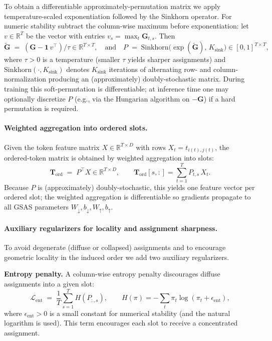 To obtain a differentiable approximately-permutation matrix we apply temperature-scaled exponentiation followed by the Sinkhorn operator. For numeric stability subtract the column-wise maximum before exponentiation: let \(v\in\mathbb{R}^T\) be the vector with entries \(v_s=\max_{t}\mathbf{G}_{t,s}\). Then
\begin{equation}
\tilde{\mathbf{G}} \;=\; (\mathbf{G} - \mathbf{1}\,v^\top)/\tau \in\mathbb{R}^{T\times T},
\quad\text{and}\quad
P \;=\; \mathrm{Sinkhorn}\big(\exp(\tilde{\mathbf{G}}),\,K_{\mathrm{sink}}\big)\in[0,1]^{T\times T},
\end{equation}
where \(\tau>0\) is a temperature (smaller \(\tau\) yields sharper assignments) and \(\mathrm{Sinkhorn}(\cdot,K_{\mathrm{sink}})\) denotes \(K_{\mathrm{sink}}\) iterations of alternating row- and column-normalization producing an (approximately) doubly-stochastic matrix. During training this soft-permutation is differentiable; at inference time one may optionally discretize \(P\) (e.g., via the Hungarian algorithm on \(-\mathbf{G}\)) if a hard permutation is required.

\paragraph{Weighted aggregation into ordered slots.}
Given the token feature matrix \(X\in\mathbb{R}^{T\times D}\) with rows \(X_t=t_{i(t),j(t)}\), the ordered-token matrix is obtained by weighted aggregation into slots:
\begin{equation}
\mathbf{T}_{\mathrm{ord}} \;=\; P^\top X \in\mathbb{R}^{T\times D},\qquad
\mathbf{T}_{\mathrm{ord}}[s,:]=\sum_{t=1}^T P_{t,s}\,X_t.
\end{equation}
Because \(P\) is (approximately) doubly-stochastic, this yields one feature vector per ordered slot; the weighted aggregation is differentiable so gradients propagate to all GSAS parameters \(W_{\downarrow},b_{\downarrow},W_{\uparrow},b_{\uparrow}\).

\paragraph{Auxiliary regularizers for locality and assignment sharpness.}
To avoid degenerate (diffuse or collapsed) assignments and to encourage geometric locality in the induced order we add two auxiliary regularizers.

\textbf{Entropy penalty.} A column-wise entropy penalty discourages diffuse assignments into a given slot:
\begin{equation}
\mathcal{L}_{\mathrm{ent}} \;=\; \frac{1}{T}\sum_{s=1}^T H(P_{:,s}),\qquad
H(\pi)=-\sum_{t}\pi_t\log(\pi_t+\epsilon_{\mathrm{ent}}),
\end{equation}
where \(\epsilon_{\mathrm{ent}}>0\) is a small constant for numerical stability (and the natural logarithm is used). This term encourages each slot to receive a concentrated assignment.

